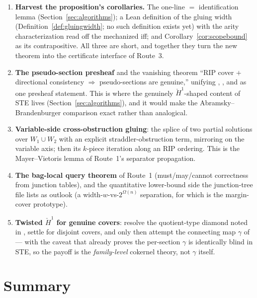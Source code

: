 \documentclass[11pt]{article}
\newcommand{\Hech}{\check H}
\begin{document}
\begin{enumerate}
\item \textbf{Harvest the proposition's corollaries.}  The one-line
   $=$  identification lemma
  (Section~\ref{sec:algorithms}); a Lean definition of the gluing
  width (Definition~\ref{def:gluingwidth}; no such definition exists
  yet) with the
  arity characterization read off the mechanized iff; and
  Corollary~\ref{cor:scopebound} as its contrapositive.  All three
  are short, and together they turn the new theorem into the
  certificate interface of Route~3.
\item \textbf{The pseudo-section presheaf} and the vanishing theorem
  ``RIP cover $+$ directional consistency $\Rightarrow$
  pseudo-sections are genuine,'' unifying
  ,
  , and
   as one presheaf statement.
  This is where the genuinely $\Hech^1$-shaped content of STE lives
  (Section~\ref{sec:algorithms}), and it would make the
  Abramsky--Brandenburger comparison exact rather than analogical.
\item \textbf{Variable-side cross-obstruction gluing}: the splice of
  two partial solutions over $W_1 \cup W_2$ with an explicit
  straddler-obstruction term, mirroring
   on the variable axis; then its
  $k$-piece iteration along an RIP ordering.  This is the
  Mayer--Vietoris lemma of Route~1's separator propagation.
\item \textbf{The bag-local query theorem} of Route~1 (must/may/cannot
  correctness from junction tables), and the quantitative
  lower-bound side the junction-tree file lists as outlook (a
  width-$w$-vs-$2^{\Omega(n)}$ separation, for which
   is the margin-cover prototype).
\item \textbf{Twisted $\Hech^1$ for genuine covers}: resolve the
  quotient-type diamond noted in , settle
   for disjoint covers, and only then attempt
  the connecting map $\gamma$ of \citet{abramsky2012cohomology} ---
  with the caveat that  already proves the
  per-section $\gamma$ is identically blind in STE, so the payoff is
  the \emph{family-level} cokernel theory, not $\gamma$ itself.
\end{enumerate}

\section{Summary}
\end{document}
